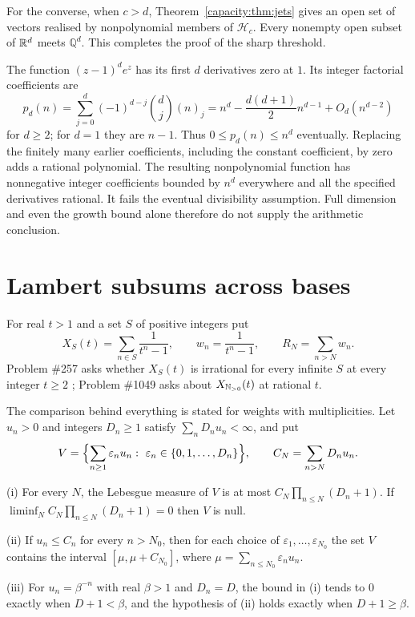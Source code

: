 \documentclass[11pt]{article}
\begin{document}
For the converse, when $c>d$, Theorem~\ref{capacity:thm:jets} gives an open
set of vectors realised by nonpolynomial members of $\mathcal H_c$.
Every nonempty open subset of $\mathbb{R}^d$ meets $\mathbb Q^d$. This completes
the proof of the sharp threshold.

\begin{remark}
The function $(z-1)^de^z$ has its first $d$ derivatives zero at $1$.
Its integer factorial coefficients are
\[
 p_d(n)=\sum_{j=0}^d(-1)^{d-j}\binom dj(n)_j
       =n^d-\frac{d(d+1)}2n^{d-1}+O_d(n^{d-2})
\]
for $d\ge2$; for $d=1$ they are $n-1$.
Thus $0\le p_d(n)\le n^d$ eventually. Replacing the finitely many earlier
coefficients, including the constant coefficient, by zero adds a rational
polynomial. The resulting nonpolynomial function has nonnegative integer
coefficients bounded by $n^d$ everywhere and all the specified derivatives
rational. It fails the eventual divisibility assumption. Full dimension
and even the growth bound alone therefore do not supply the arithmetic
conclusion.
\end{remark}


\section{Lambert subsums across bases}\label{sec:results}

For real $t>1$ and a set $S$ of
positive integers put
\[
 X_S(t)=\sum_{n\in S}\frac{1}{t^n-1},\qquad
 w_n=\frac{1}{t^n-1},\qquad R_N=\sum_{n>N}w_n .
\]
Problem \#257 asks whether $X_S(t)$ is irrational for every infinite $S$ at
every integer $t\ge2$ \cite[p.~62]{erdosgraham1980}; Problem \#1049 asks about
$X_{\mathbb{N}_{>0}}(t)$ at rational $t$.

The comparison behind everything is stated for weights with multiplicities.
Let $u_n>0$ and integers $D_n\ge1$ satisfy $\sum_nD_nu_n<\infty$, and put
\[
 V=\Bigl\{\sum_{n\ge1}\varepsilon_nu_n:\ \varepsilon_n\in\{0,1,\dots,D_n\}\Bigr\},
 \qquad C_N=\sum_{n>N}D_nu_n .
\]

\begin{theorem}\label{thm:dichotomy}
\textup{(i)} For every $N$, the Lebesgue measure of $V$ is at most
$C_N\prod_{n\le N}(D_n+1)$.  If $\liminf_NC_N\prod_{n\le N}(D_n+1)=0$ then $V$
is null.

\textup{(ii)} If $u_n\le C_n$ for every $n>N_0$, then for each choice of
$\varepsilon_1,\dots,\varepsilon_{N_0}$ the set $V$ contains the interval
$[\mu,\mu+C_{N_0}]$, where $\mu=\sum_{n\le N_0}\varepsilon_nu_n$.

\textup{(iii)} For $u_n=\beta^{-n}$ with real $\beta>1$ and $D_n=D$, the bound in
\textup{(i)} tends to $0$ exactly when $D+1<\beta$, and the hypothesis of
\textup{(ii)} holds exactly when $D+1\ge\beta$.
\end{theorem}
\end{document}
